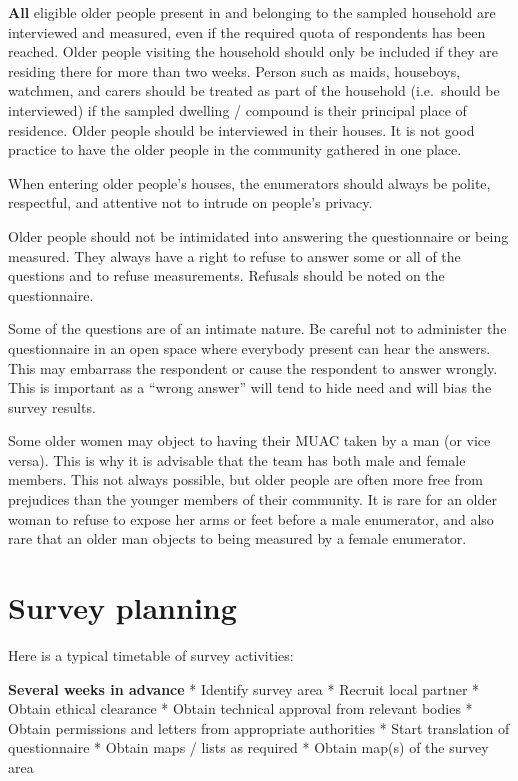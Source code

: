 \documentclass[12pt,a4paper]{book}
\theoremstyle{definition}
\theoremstyle{definition}
\theoremstyle{definition}
\theoremstyle{remark}
\begin{document}
\textbf{All} eligible older people present in and belonging to the
sampled household are interviewed and measured, even if the required
quota of respondents has been reached. Older people visiting the
household should only be included if they are residing there for more
than two weeks. Person such as maids, houseboys, watchmen, and carers
should be treated as part of the household (i.e.~should be interviewed)
if the sampled dwelling / compound is their principal place of
residence. Older people should be interviewed in their houses. It is not
good practice to have the older people in the community gathered in one
place.

When entering older people's houses, the enumerators should always be
polite, respectful, and attentive not to intrude on people's privacy.

Older people should not be intimidated into answering the questionnaire
or being measured. They always have a right to refuse to answer some or
all of the questions and to refuse measurements. Refusals should be
noted on the questionnaire.

Some of the questions are of an intimate nature. Be careful not to
administer the questionnaire in an open space where everybody present
can hear the answers. This may embarrass the respondent or cause the
respondent to answer wrongly. This is important as a ``wrong answer''
will tend to hide need and will bias the survey results.

Some older women may object to having their MUAC taken by a man (or vice
versa). This is why it is advisable that the team has both male and
female members. This not always possible, but older people are often
more free from prejudices than the younger members of their community.
It is rare for an older woman to refuse to expose her arms or feet
before a male enumerator, and also rare that an older man objects to
being measured by a female enumerator.

\newpage

\hypertarget{survey-planning}{%
\section{Survey planning}\label{survey-planning}}

Here is a typical timetable of survey activities:

\textbf{Several weeks in advance} * Identify survey area * Recruit local
partner * Obtain ethical clearance * Obtain technical approval from
relevant bodies * Obtain permissions and letters from appropriate
authorities * Start translation of questionnaire * Obtain maps / lists
as required * Obtain map(s) of the survey area
\end{document}
